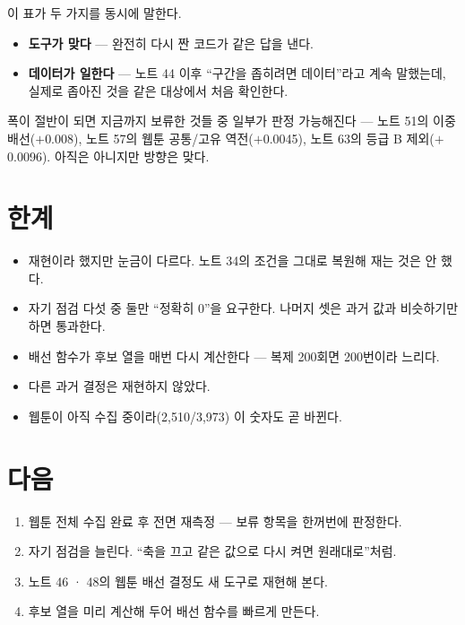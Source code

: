 \documentclass[10pt]{article}
\begin{document}
이 표가 두 가지를 동시에 말한다.

\begin{itemize}[leftmargin=1.1em,itemsep=0.15em]
\item \textbf{도구가 맞다} --- 완전히 다시 짠 코드가 같은 답을 낸다.
\item \textbf{데이터가 일한다} --- 노트 44 이후 ``구간을 좁히려면 데이터''라고
      계속 말했는데, 실제로 좁아진 것을 같은 대상에서 처음 확인한다.
\end{itemize}

폭이 절반이 되면 지금까지 보류한 것들 중 일부가 판정 가능해진다 --- 노트 51의
이중 배선($+$0.008), 노트 57의 웹툰 공통/고유 역전($+$0.0045), 노트 63의
등급 B 제외($+$0.0096). 아직은 아니지만 방향은 맞다.

\section{한계}

\begin{itemize}[leftmargin=1.1em,itemsep=0.15em]
\item 재현이라 했지만 눈금이 다르다. 노트 34의 조건을 그대로 복원해 재는 것은
      안 했다.
\item 자기 점검 다섯 중 둘만 ``정확히 0''을 요구한다. 나머지 셋은 과거 값과
      비슷하기만 하면 통과한다.
\item 배선 함수가 후보 열을 매번 다시 계산한다 --- 복제 200회면 200번이라 느리다.
\item 다른 과거 결정은 재현하지 않았다.
\item 웹툰이 아직 수집 중이라(2,510/3,973) 이 숫자도 곧 바뀐다.
\end{itemize}

\section{다음}

\begin{enumerate}[leftmargin=1.3em,itemsep=0.15em]
\item 웹툰 전체 수집 완료 후 전면 재측정 --- 보류 항목을 한꺼번에 판정한다.
\item 자기 점검을 늘린다. ``축을 끄고 같은 값으로 다시 켜면 원래대로''처럼.
\item 노트 46 · 48의 웹툰 배선 결정도 새 도구로 재현해 본다.
\item 후보 열을 미리 계산해 두어 배선 함수를 빠르게 만든다.
\end{enumerate}
\end{document}
